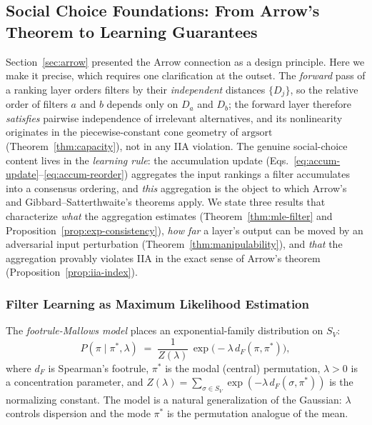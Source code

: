 \documentclass[12pt]{article}
\newcommand{\argsort}{\mathrm{argsort}}
\begin{document}
\subsection{Social Choice Foundations: From Arrow's Theorem to Learning Guarantees}
\label{sec:social-choice-theory}

Section~\ref{sec:arrow} presented the Arrow connection as a design principle.  Here we make it precise, which requires one clarification at the outset.  The \emph{forward} pass of a ranking layer orders filters by their \emph{independent} distances $\{D_j\}$, so the relative order of filters $a$ and $b$ depends only on $D_a$ and $D_b$; the forward layer therefore \emph{satisfies} pairwise independence of irrelevant alternatives, and its nonlinearity originates in the piecewise-constant cone geometry of $\argsort$ (Theorem~\ref{thm:capacity}), not in any IIA violation.  The genuine social-choice content lives in the \emph{learning rule}: the accumulation update (Eqs.~\ref{eq:accum-update}--\ref{eq:accum-reorder}) aggregates the input rankings a filter accumulates into a consensus ordering, and \emph{this} aggregation is the object to which Arrow's and Gibbard--Satterthwaite's theorems apply.  We state three results that characterize \emph{what} the aggregation estimates (Theorem~\ref{thm:mle-filter} and Proposition~\ref{prop:exp-consistency}), \emph{how far} a layer's output can be moved by an adversarial input perturbation (Theorem~\ref{thm:manipulability}), and \emph{that} the aggregation provably violates IIA in the exact sense of Arrow's theorem (Proposition~\ref{prop:iia-index}).

\subsubsection{Filter Learning as Maximum Likelihood Estimation}

The \emph{footrule-Mallows model} \citep{mallows1957nonnull} places an exponential-family distribution on $S_V$:
\begin{equation}
\label{eq:mallows}
P(\pi \mid \pi^*, \lambda) \;=\; \frac{1}{Z(\lambda)}\,\exp\!\bigl(-\lambda\, d_F(\pi, \pi^*)\bigr),
\end{equation}
where $d_F$ is Spearman's footrule, $\pi^*$ is the modal (central) permutation, $\lambda > 0$ is a concentration parameter, and $Z(\lambda) = \sum_{\sigma \in S_V} \exp(-\lambda\, d_F(\sigma, \pi^*))$ is the normalizing constant.  The model is a natural generalization of the Gaussian: $\lambda$ controls dispersion and the mode $\pi^*$ is the permutation analogue of the mean.
\end{document}
